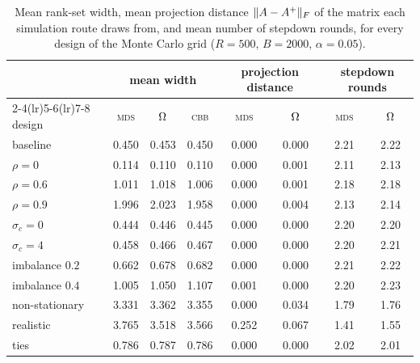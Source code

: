 \begin{table}[htb]
  \centering
  \caption[Monte Carlo width and projection distance, full grid]{Mean rank-set width, mean projection distance $\lVert A-A^{+} \rVert_{F}$ of the matrix each simulation route draws from, and mean number of stepdown rounds, for every design of the Monte Carlo grid ($R=500$, $B=2000$, $\alpha=0.05$).}
  \label{tab:app-mc-width}
  \small
  \begin{tabular}{lccccccc}
    \toprule
    & \multicolumn{3}{c}{mean width} & \multicolumn{2}{c}{projection distance} & \multicolumn{2}{c}{stepdown rounds}\\
    \cmidrule(lr){2-4}\cmidrule(lr){5-6}\cmidrule(lr){7-8}
    design & \textsc{mds} & $\Omega$ & \textsc{cbb} & \textsc{mds} & $\Omega$ & \textsc{mds} & $\Omega$\\
    \midrule
    baseline & 0.450 & 0.453 & 0.450 & 0.000 & 0.000 & 2.21 & 2.22\\
    $\rho=0$ & 0.114 & 0.110 & 0.110 & 0.000 & 0.001 & 2.11 & 2.13\\
    $\rho=0.6$ & 1.011 & 1.018 & 1.006 & 0.000 & 0.001 & 2.18 & 2.18\\
    $\rho=0.9$ & 1.996 & 2.023 & 1.958 & 0.000 & 0.004 & 2.13 & 2.14\\
    $\sigma_c=0$ & 0.444 & 0.446 & 0.445 & 0.000 & 0.000 & 2.20 & 2.20\\
    $\sigma_c=4$ & 0.458 & 0.466 & 0.467 & 0.000 & 0.000 & 2.20 & 2.21\\
    imbalance $0.2$ & 0.662 & 0.678 & 0.682 & 0.000 & 0.000 & 2.21 & 2.22\\
    imbalance $0.4$ & 1.005 & 1.050 & 1.107 & 0.001 & 0.000 & 2.20 & 2.23\\
    non-stationary & 3.331 & 3.362 & 3.355 & 0.000 & 0.034 & 1.79 & 1.76\\
    realistic & 3.765 & 3.518 & 3.566 & 0.252 & 0.067 & 1.41 & 1.55\\
    ties & 0.786 & 0.787 & 0.786 & 0.000 & 0.000 & 2.02 & 2.01\\
    \bottomrule
  \end{tabular}
\end{table}
